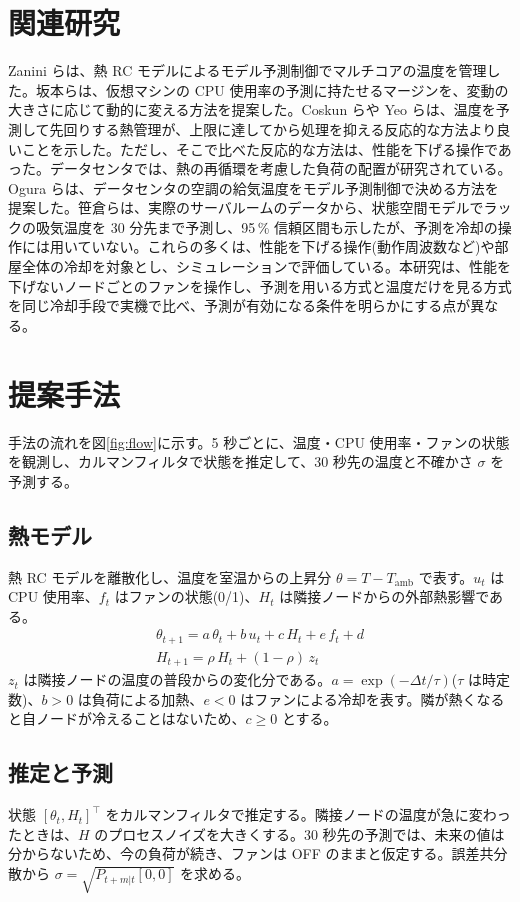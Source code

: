 \documentclass[10pt,uplatex,dvipdfmx,twocolumn]{jsarticle}
\begin{document}
\section{関連研究}
Zanini ら\cite{zanini}は、熱 RC モデルによるモデル予測制御でマルチコアの温度を管理した。坂本ら\cite{sakamoto}は、仮想マシンの CPU 使用率の予測に持たせるマージンを、変動の大きさに応じて動的に変える方法を提案した。Coskun ら\cite{coskun}や Yeo ら\cite{yeo}は、温度を予測して先回りする熱管理が、上限に達してから処理を抑える反応的な方法より良いことを示した。ただし、そこで比べた反応的な方法は、性能を下げる操作であった。データセンタでは、熱の再循環を考慮した負荷の配置が研究されている\cite{moore,tang}。Ogura ら\cite{ogura}は、データセンタの空調の給気温度をモデル予測制御で決める方法を提案した。笹倉ら\cite{sasakura}は、実際のサーバルームのデータから、状態空間モデルでラックの吸気温度を 30 分先まで予測し、95\,\% 信頼区間も示したが、予測を冷却の操作には用いていない。これらの多くは、性能を下げる操作(動作周波数など)や部屋全体の冷却を対象とし、シミュレーションで評価している。本研究は、性能を下げないノードごとのファンを操作し、予測を用いる方式と温度だけを見る方式を同じ冷却手段で実機で比べ、予測が有効になる条件を明らかにする点が異なる。

\section{提案手法}
手法の流れを図\ref{fig:flow}に示す。5 秒ごとに、温度・CPU 使用率・ファンの状態を観測し、カルマンフィルタで状態を推定して、30 秒先の温度と不確かさ $\sigma$ を予測する。

\subsection{熱モデル}
熱 RC モデルを離散化し、温度を室温からの上昇分 $\theta = T - T_{\mathrm{amb}}$ で表す。$u_t$ は CPU 使用率、$f_t$ はファンの状態(0/1)、$H_t$ は隣接ノードからの外部熱影響である。
\begin{gather}
  \theta_{t+1} = a\,\theta_t + b\,u_t + c\,H_t + e\,f_t + d \\
  H_{t+1} = \rho\,H_t + (1-\rho)\,z_t
\end{gather}
$z_t$ は隣接ノードの温度の普段からの変化分である。$a = \exp(-\Delta t/\tau)$($\tau$ は時定数)、$b > 0$ は負荷による加熱、$e < 0$ はファンによる冷却を表す。隣が熱くなると自ノードが冷えることはないため、$c \ge 0$ とする。

\subsection{推定と予測}
状態 $[\theta_t, H_t]^\top$ をカルマンフィルタで推定する。隣接ノードの温度が急に変わったときは、$H$ のプロセスノイズを大きくする。30 秒先の予測では、未来の値は分からないため、今の負荷が続き、ファンは OFF のままと仮定する。誤差共分散から $\sigma = \sqrt{P_{t+m|t}[0,0]}$ を求める。
\end{document}

